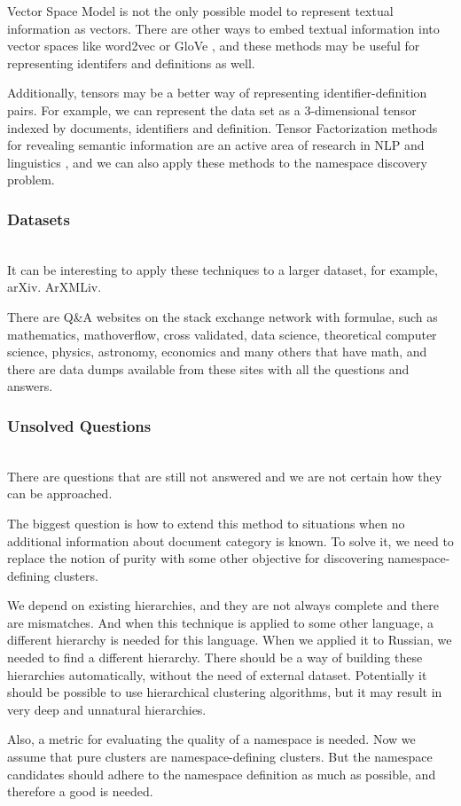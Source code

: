 Vector Space Model is not the only possible model to represent textual 
information as vectors. There are other ways to embed textual information
into vector spaces like word2vec \cite{mikolov2013efficient} or 
GloVe \cite{pennington2014glove}, and these methods may be useful 
for representing identifers and definitions as well.

Additionally, tensors may be a better way of representing 
identifier-definition pairs. For example, we can represent the data set 
as a 3-dimensional tensor indexed by documents, identifiers and definition. 
Tensor Factorization methods for revealing semantic information 
are an active area of research in NLP and linguistics \cite{anisimov2014semantic},
and we can also apply these methods to the namespace discovery problem. 




\subsubsection{Datasets}  \ \\


It can be interesting to apply these techniques to a larger dataset, for example, arXiv.
ArXMLiv.

There are Q\&A websites on the stack exchange network with formulae, such as 
mathematics, mathoverflow, cross validated, data science, theoretical computer science, 
physics, astronomy, economics and many others that have math, and there are data dumps available 
from these sites with all the questions and answers. 



\subsubsection{Unsolved Questions} \ \\

There are questions that are still not answered and we are not certain 
how they can be approached. 

The biggest question is how to extend this method to situations when
no additional information about document category is known. To solve
it, we need to replace the notion of purity with some other objective
for discovering namespace-defining clusters.

We depend on existing hierarchies, and they are not always complete and
there are mismatches. And when this technique is applied to some
other language, a different hierarchy is needed for this language. When
we applied it to Russian, we needed to find a different hierarchy.
There should be a way of building these hierarchies
automatically, without the need of external dataset.
Potentially it should be possible to use hierarchical clustering 
algorithms, but it may result in very deep and unnatural hierarchies. 

Also, a metric for evaluating the quality of a namespace is needed.
Now we assume that pure clusters are namespace-defining clusters. But the namespace
candidates should adhere to the namespace definition as much as possible,
and therefore a good is needed.